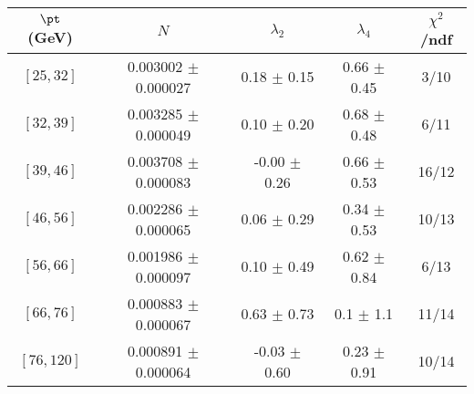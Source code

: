 \begin{tabular}{c||c|c|c|c}
$\pt$ (GeV) & $N$ & $\lambda_{2}$ & $\lambda_4$  & $\chi^2$/ndf  \\
\hline
$[25, 32]$ & 0.003002 $\pm$ 0.000027 & 0.18 $\pm$ 0.15 & 0.66 $\pm$ 0.45 & 3/10\\
$[32, 39]$ & 0.003285 $\pm$ 0.000049 & 0.10 $\pm$ 0.20 & 0.68 $\pm$ 0.48 & 6/11\\
$[39, 46]$ & 0.003708 $\pm$ 0.000083 & -0.00 $\pm$ 0.26 & 0.66 $\pm$ 0.53 & 16/12\\
$[46, 56]$ & 0.002286 $\pm$ 0.000065 & 0.06 $\pm$ 0.29 & 0.34 $\pm$ 0.53 & 10/13\\
$[56, 66]$ & 0.001986 $\pm$ 0.000097 & 0.10 $\pm$ 0.49 & 0.62 $\pm$ 0.84 & 6/13\\
$[66, 76]$ & 0.000883 $\pm$ 0.000067 & 0.63 $\pm$ 0.73 & 0.1 $\pm$ 1.1 & 11/14\\
$[76, 120]$ & 0.000891 $\pm$ 0.000064 & -0.03 $\pm$ 0.60 & 0.23 $\pm$ 0.91 & 10/14\\
\end{tabular}
